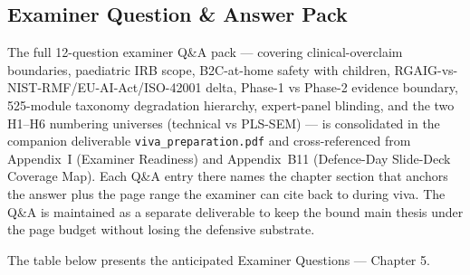 
\subsection*{Examiner Question \& Answer Pack}
\label{sec:ch5_examiner_qa_pointer}

\noindent The full 12-question examiner Q\&A pack --- covering clinical-overclaim boundaries, paediatric IRB scope, B2C-at-home safety with children, RGAIG-vs-NIST-RMF/EU-AI-Act/ISO-42001 delta, Phase-1 vs Phase-2 evidence boundary, 525-module taxonomy degradation hierarchy, expert-panel blinding, and the two H1--H6 numbering universes (technical vs PLS-SEM) --- is consolidated in the companion deliverable \texttt{viva\_preparation.pdf} and cross-referenced from Appendix~I (Examiner Readiness) and Appendix~B11 (Defence-Day Slide-Deck Coverage Map). Each Q\&A entry there names the chapter section that anchors the answer plus the page range the examiner can cite back to during viva. The Q\&A is maintained as a separate deliverable to keep the bound main thesis under the page budget without losing the defensive substrate.

\iffalse %

\noindent The table below presents the anticipated Examiner Questions --- Chapter 5.

